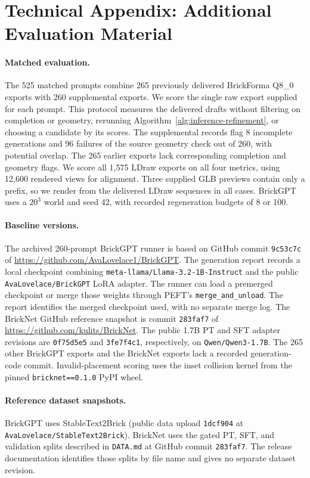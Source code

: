 \documentclass[letterpaper]{article} %
\begin{document}
\section{Technical Appendix: Additional Evaluation Material}
\label{app:eval}

\paragraph{Matched evaluation.}

The 525 matched prompts combine 265 previously delivered BrickForma Q8\_0 exports with 260 supplemental exports. We score the single raw export supplied for each prompt. This protocol measures the delivered drafts without filtering on completion or geometry, rerunning Algorithm~\ref{alg:inference-refinement}, or choosing a candidate by its scores. The supplemental records flag 8 incomplete generations and 96 failures of the source geometry check out of 260, with potential overlap. The 265 earlier exports lack corresponding completion and geometry flags. We score all 1,575 LDraw exports on all four metrics, using 12,600 rendered views for alignment. Three supplied GLB previews contain only a prefix, so we render from the delivered LDraw sequences in all cases. BrickGPT uses a $20^3$ world and seed 42, with recorded regeneration budgets of 8 or 100.

\begin{samepage}
\paragraph{Baseline versions.} The archived 260-prompt BrickGPT runner is based on GitHub commit \texttt{9c53c7c} of \url{https://github.com/AvaLovelace1/BrickGPT}. The generation report records a local checkpoint combining \texttt{meta-llama/Llama-3.2-1B-Instruct} and the public \texttt{AvaLovelace/BrickGPT} LoRA adapter. The runner can load a premerged checkpoint or merge those weights through PEFT's \texttt{merge\_and\_unload}. The report identifies the merged checkpoint used, with no separate merge log. The BrickNet GitHub reference snapshot is commit \texttt{283faf7} of \url{https://github.com/kulits/BrickNet}. The public 1.7B PT and SFT adapter revisions are \texttt{0f75d5e5} and \texttt{3fe7f4c1}, respectively, on \texttt{Qwen/Qwen3-1.7B}. The 265 other BrickGPT exports and the BrickNet exports lack a recorded generation-code commit. Invalid-placement scoring uses the inset collision kernel from the pinned \texttt{bricknet==0.1.0} PyPI wheel.

\paragraph{Reference dataset snapshots.} BrickGPT uses StableText2Brick (public data upload \texttt{1dcf904} at \texttt{AvaLovelace/StableText2Brick}). BrickNet uses the gated PT, SFT, and validation splits described in \texttt{DATA.md} at GitHub commit \texttt{283faf7}. The release documentation identifies those splits by file name and gives no separate dataset revision.
\end{samepage}
\end{document}
